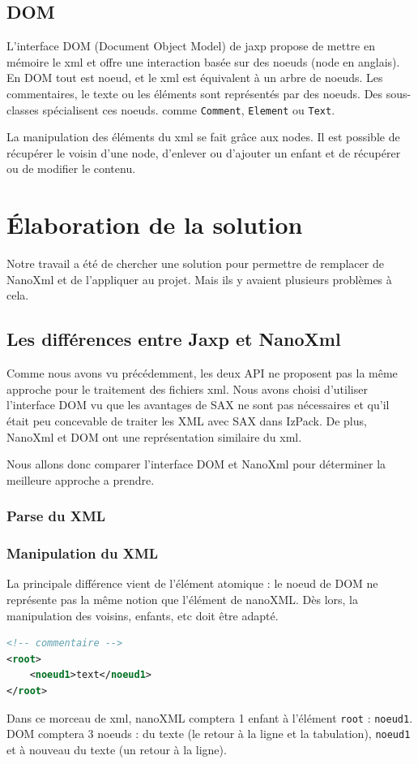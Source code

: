 \subsection{DOM}
L'interface DOM (Document Object Model) de jaxp propose de mettre en mémoire le xml et offre une interaction basée sur des noeuds (node en anglais).
En DOM tout est noeud, et le xml est équivalent à un arbre de noeuds.
Les commentaires, le texte ou les éléments sont représentés par des noeuds.
Des sous-classes spécialisent ces noeuds. comme \verb|Comment|, \verb|Element| ou \verb|Text|.

La manipulation des éléments du xml se fait grâce aux nodes.
Il est possible de récupérer le voisin d'une node, d'enlever ou d'ajouter un enfant et de récupérer ou de modifier le contenu.

\section{Élaboration de la solution}
Notre travail a été de chercher une solution pour permettre de remplacer de NanoXml et de l'appliquer au projet. Mais ils y avaient plusieurs problèmes à cela.

\subsection{Les différences entre Jaxp et NanoXml}
Comme nous avons vu précédemment, les deux API ne proposent pas la même approche pour le traitement des fichiers xml.
Nous avons choisi d'utiliser l'interface DOM vu que les avantages de SAX ne sont pas nécessaires et qu'il était peu concevable de traiter les XML avec SAX dans IzPack.
De plus, NanoXml et DOM ont une représentation similaire du xml.

Nous allons donc comparer l'interface DOM et NanoXml pour déterminer la meilleure approche a prendre.

\subsubsection{Parse du XML}

\subsubsection{Manipulation du XML}
La principale différence vient de l'élément atomique : le noeud de DOM ne représente pas la même notion que l'élément de nanoXML.
Dès lors, la manipulation des voisins, enfants, etc doit être adapté.
\begin{lstlisting}[language=xml]
<!-- commentaire -->
<root>
	<noeud1>text</noeud1>
</root>
\end{lstlisting}
Dans ce morceau de xml, nanoXML comptera 1 enfant à l'élément \verb|root| : \verb|noeud1|.
DOM comptera 3 noeuds : du texte (le retour à la ligne et la tabulation), \verb|noeud1| et à nouveau du texte (un retour à la ligne).

